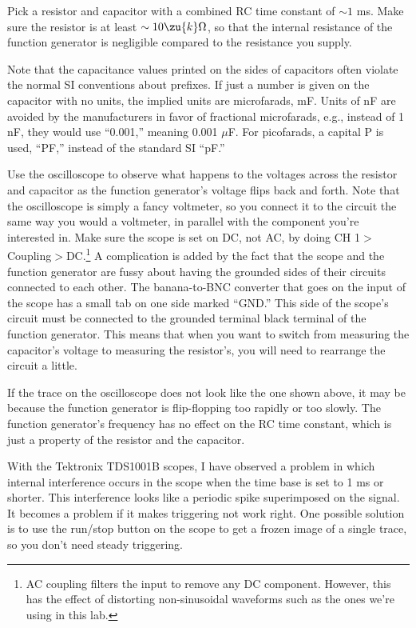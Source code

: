 
Pick a resistor and capacitor with a combined RC time
constant of $\sim1$ ms. Make sure the resistor is at least
$\sim10\zu{k}\Omega $, so that the internal resistance of the
function generator is negligible compared to the resistance you supply.

Note that the capacitance values printed on the sides of
capacitors often violate the normal SI conventions about
prefixes. If just a number is given on the capacitor with no
units, the implied units are microfarads, mF. Units of nF
are avoided by the manufacturers in favor of fractional
microfarads, e.g., instead of 1 nF, they would use ``0.001,''
meaning 0.001 $\mu $F. For picofarads, a capital P is
used, ``PF,'' instead of the standard SI ``pF.''

 Use the oscilloscope to observe what happens to the
voltages across the resistor and capacitor as the function
generator's voltage flips back and forth. Note that the
oscilloscope is simply a fancy voltmeter, so you connect it
to the circuit the same way you would a voltmeter, in
parallel with the component you're interested in. Make sure the
scope is set on DC, not AC, by doing CH 1$>$Coupling$>$DC.\footnote{AC coupling filters the input to remove any DC
component. However, this has the effect of distorting non-sinusoidal waveforms such as the ones we're using in this
lab.}
A complication is added by the fact that the scope and the
function generator are fussy about having the grounded sides
of their circuits connected to each other. The banana-to-BNC
converter that goes on the input of the scope has a small
tab on one side marked ``GND.'' This side of the scope's
circuit must be connected to the grounded terminal black terminal of the
function generator. This means that when you want to switch
from measuring the capacitor's voltage to measuring the
resistor's, you will need to rearrange the circuit a little.

If the trace on the oscilloscope does not look like the one
shown above, it may be because the function generator is
flip-flopping too rapidly or too slowly. The function
generator's frequency has no effect on the RC time constant,
which is just a property of the resistor and the capacitor. 

With the Tektronix TDS1001B scopes, I have observed a problem
in which internal interference occurs in the scope when the
time base is set to 1 ms or shorter. This interference looks like
a periodic spike superimposed on the signal. It becomes a problem
if it makes triggering not work right. One possible solution is
to use the run/stop button on the scope to get a frozen image of a single trace,
so you don't need steady triggering.

